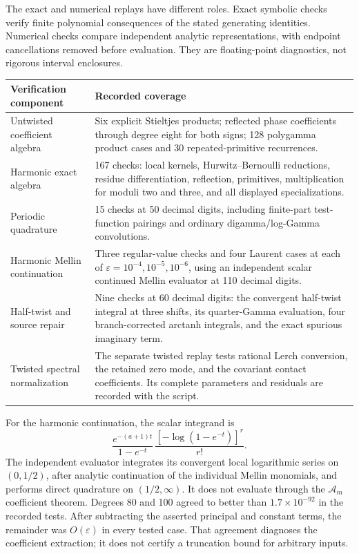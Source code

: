 \documentclass[11pt,letterpaper]{article}
\numberwithin{equation}{section}
\theoremstyle{plain}
\theoremstyle{definition}
\theoremstyle{remark}
\begin{document}
The exact and numerical replays have different roles.
Exact symbolic checks verify finite polynomial consequences of the
stated generating identities. Numerical checks compare independent
analytic representations, with endpoint cancellations removed before
evaluation. They are floating-point diagnostics, not rigorous
interval enclosures.

\begin{center}
\begin{tabularx}{\textwidth}{@{}p{}X@{}}
\toprule
Verification component & Recorded coverage\\
\midrule
Untwisted coefficient algebra &
Six explicit Stieltjes products; reflected phase coefficients through
degree eight for both signs; 128 polygamma product cases and
30 repeated-primitive recurrences.\\[3pt]
Harmonic exact algebra &
167 checks: local kernels, Hurwitz--Bernoulli reductions, residue
differentiation, reflection, primitives, multiplication for moduli
two and three, and all displayed specializations.\\[3pt]
Periodic quadrature &
15 checks at 50 decimal digits, including finite-part test-function
pairings and ordinary digamma/log-Gamma convolutions.\\[3pt]
Harmonic Mellin continuation &
Three regular-value checks and four Laurent cases at each of
\(\varepsilon=10^{-4},10^{-5},10^{-6}\), using an independent scalar
continued Mellin evaluator at 110 decimal digits.\\[3pt]
Half-twist and source repair &
Nine checks at 60 decimal digits: the convergent half-twist integral
at three shifts, its quarter-Gamma evaluation, four branch-corrected
arctanh integrals, and the exact spurious imaginary term.\\[3pt]
Twisted spectral normalization &
The separate twisted replay tests rational Lerch conversion,
the retained zero mode, and the covariant contact coefficients.
Its complete parameters and residuals are recorded with the script.\\
\bottomrule
\end{tabularx}
\end{center}

For the harmonic continuation, the scalar integrand is
\[
 \frac{e^{-(a+1)t}}{1-e^{-t}}\,
       \frac{[-\log(1-e^{-t})]^r}{r!}.
\]
The independent evaluator integrates its convergent local
logarithmic series on \((0,1/2)\), after analytic continuation of the
individual Mellin monomials, and performs direct quadrature on
\((1/2,\infty)\). It does not evaluate through the
\(\mathcal A_m\) coefficient theorem. Degrees 80 and 100 agreed to
better than \(1.7\times10^{-92}\) in the recorded tests. After
subtracting the asserted principal and constant terms, the remainder
was \(O(\varepsilon)\) in every tested case. That agreement diagnoses
the coefficient extraction; it does not certify a truncation bound
for arbitrary inputs.
\end{document}
